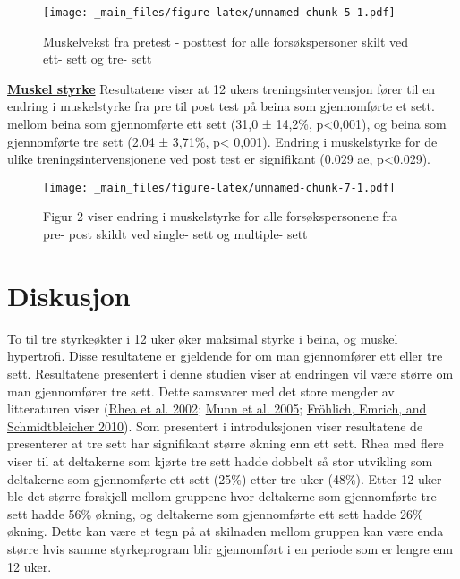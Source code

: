 \documentclass[
]{book}
\begin{document}
\begin{figure}
\centering
\texttt{[image: \_main\_files/figure-latex/unnamed-chunk-5-1.pdf]}
\caption{Muskelvekst fra pretest - posttest for alle forsøkspersoner
skilt ved ett- sett og tre- sett}
\end{figure}

\underline{\textbf{Muskel styrke}} Resultatene viser at 12 ukers
treningsintervensjon fører til en endring i muskelstyrke fra pre til
post test på beina som gjennomførte et sett. mellom beina som
gjennomførte ett sett (31,0 ± 14,2\%, p\textless0,001), og beina som
gjennomførte tre sett (2,04 ± 3,71\%, p\textless{} 0,001). Endring i
muskelstyrke for de ulike treningsintervensjonene ved post test er
signifikant (0.029 ae, p\textless0.029).

\begin{figure}
\centering
\texttt{[image: \_main\_files/figure-latex/unnamed-chunk-7-1.pdf]}
\caption{Figur 2 viser endring i muskelstyrke for alle forsøkspersonene
fra pre- post skildt ved single- sett og multiple- sett}
\end{figure}

\hypertarget{diskusjon-1}{%
\section{Diskusjon}\label{diskusjon-1}}

To til tre styrkeøkter i 12 uker øker maksimal styrke i beina, og muskel
hypertrofi. Disse resultatene er gjeldende for om man gjennomfører ett
eller tre sett. Resultatene presentert i denne studien viser at
endringen vil være større om man gjennomfører tre sett. Dette samsvarer
med det store mengder av litteraturen viser
(\protect\hyperlink{ref-rhea2002}{Rhea et al. 2002};
\protect\hyperlink{ref-munn2005}{Munn et al. 2005};
\protect\hyperlink{ref-fruxf6hlich2010}{Fröhlich, Emrich, and
Schmidtbleicher 2010}). Som presentert i introduksjonen viser
resultatene de presenterer at tre sett har signifikant større økning enn
ett sett. Rhea med flere viser til at deltakerne som kjørte tre sett
hadde dobbelt så stor utvikling som deltakerne som gjennomførte ett sett
(25\%) etter tre uker (48\%). Etter 12 uker ble det større forskjell
mellom gruppene hvor deltakerne som gjennomførte tre sett hadde 56\%
økning, og deltakerne som gjennomførte ett sett hadde 26\% økning. Dette
kan være et tegn på at skilnaden mellom gruppen kan være enda større
hvis samme styrkeprogram blir gjennomført i en periode som er lengre enn
12 uker.
\end{document}
